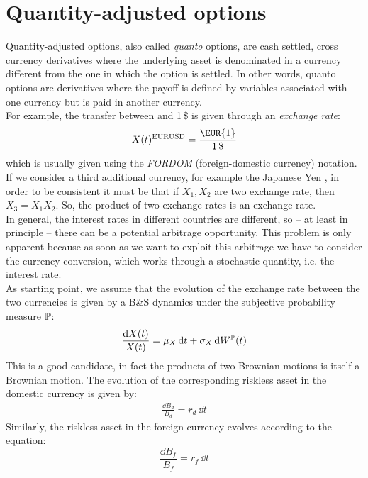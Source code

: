 \section{Quantity-adjusted options} %
Quantity-adjusted options, also called \emph{quanto} options, are cash settled, cross currency derivatives where the underlying asset is denominated in a currency different from the one in which the option is settled. In other words, quanto options are derivatives where the payoff is defined by variables associated with one currency but is paid in another currency. \\
For example, the transfer between  and 1\,\$ is given through an \emph{exchange rate}:
\begin{equation}
    X(t)^{\text{EURUSD}} = \dfrac{\text{\EUR{1}}}{1\,\$}
\end{equation}
which is usually given using the \emph{FORDOM} (foreign-domestic currency) notation. If we consider a third additional currency, for example the Japanese Yen \textyen, in order to be consistent it must be that if $X_1, X_2$ are two exchange rate, then $X_3 = X_1X_2$. So, the product of two exchange rates is an exchange rate.\\
In general, the interest rates in different countries are different, so  -- at least in principle -- there can be a potential arbitrage opportunity. This problem is only apparent because as soon as we want to exploit this arbitrage we have to consider the currency conversion, which works through a stochastic quantity, i.e. the interest rate. \\
As starting point, we assume that the evolution of the exchange rate between the two currencies is given by a B\&S dynamics under the subjective probability measure $\mathbb{P}$:
\begin{align}
    \frac{\dd X(t)}{X(t)} = \mu_X\,\dd t + \sigma_X\,\dd W^{\mathbb{P}}(t)
\end{align}
This is a good candidate, in fact the products of two Brownian motions is itself a Brownian motion. The evolution of the corresponding riskless asset in the domestic currency is given by:
\begin{align}\label{dd}
    \frac{\dd B_d}{B_d} = r_d\,\dd t
\end{align}
Similarly, the riskless asset in the foreign currency evolves according to the equation:
\begin{equation}\label{f}
    \frac{\dd B_f}{B_f} = r_f\,\dd t
\end{equation}
